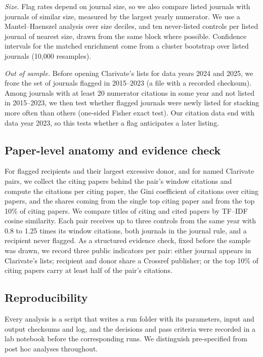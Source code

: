 \emph{Size.} Flag rates depend on journal size, so we also compare listed journals with journals of similar size,
measured by the largest yearly numerator. We use a Mantel--Haenszel analysis over size deciles, and ten never-listed
controls per listed journal of nearest size, drawn from the same block where possible. Confidence intervals for the
matched enrichment come from a cluster bootstrap over listed journals (10,000 resamples).

\emph{Out of sample.} Before opening Clarivate's lists for data years 2024 and 2025, we froze the set of journals
flagged in 2015--2023 (a file with a recorded checksum). Among journals with at least 20 numerator citations in some
year and not listed in 2015--2023, we then test whether flagged journals were newly listed for stacking more often
than others (one-sided Fisher exact test). Our citation data end with data year 2023, so this tests whether a flag
anticipates a later listing.

\subsection{Paper-level anatomy and evidence check}
For flagged recipients and their largest excessive donor, and for named Clarivate pairs, we collect the citing papers
behind the pair's window citations and compute the citations per citing paper, the Gini coefficient of citations
over citing papers, and the shares coming from the single top citing paper and from the top 10\% of citing papers. We
compare titles of citing and cited papers by TF--IDF cosine similarity. Each pair receives up to three controls from
the same year with 0.8 to 1.25 times its window citations, both journals in the journal rule, and a recipient never
flagged. As a structured evidence check, fixed before the sample was drawn, we record three public indicators per
pair: either journal appears in Clarivate's lists; recipient and donor share a Crossref publisher; or the top 10\% of
citing papers carry at least half of the pair's citations.

\subsection{Reproducibility}
Every analysis is a script that writes a run folder with its parameters, input and output checksums and log, and the
decisions and pass criteria were recorded in a lab notebook before the corresponding runs. We distinguish
pre-specified from post hoc analyses throughout.


